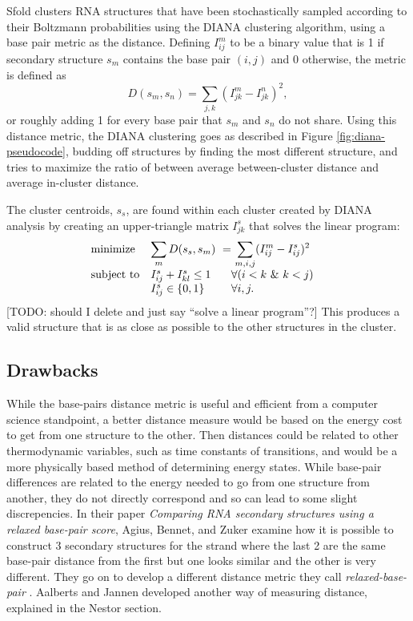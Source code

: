 Sfold clusters RNA structures that have been stochastically sampled
according to their Boltzmann probabilities using the DIANA clustering
algorithm, using a base pair metric as the distance. Defining
$I_{ij}^m$ to be a binary value that is 1 if secondary structure $s_m$
contains the base pair $(i,j)$ and 0 otherwise, the metric is defined
as
\begin{equation}
D(s_m, s_n) = \sum_{j,k} (I^m_{jk} - I^n_{jk})^2,
\end{equation}
or roughly adding 1 for every base pair that $s_m$ and $s_n$ do not
share. Using this distance metric, the DIANA clustering goes as
described in Figure \ref{fig:diana-pseudocode}, budding off structures
by finding the most different structure, and tries to maximize the
ratio of between average between-cluster distance and average
in-cluster distance.

The cluster centroids, $s_s$, are found within each cluster created by
DIANA analysis by creating an upper-triangle matrix $I^s_{jk}$ that
solves the linear program:
\begin{equation}
\begin{array}{ll@{}ll}
\text{minimize}  &\displaystyle\sum_{m} D(s_s, s_m)\  =&\ \displaystyle\sum_{m,i,j}( I^m_{ij} - I^s_{ij})^2 \\
\text{subject to}& I^s_{ij} + I^s_{kl} \leq 1    & \forall (i < k\ \&\ k < j) \\
                                                              & I^s_{ij} \in \{0, 1\} & \forall i,j. &
\end{array}
\end{equation}
[TODO: should I delete and just say ``solve a linear program''?]
This produces a valid structure that is as close as possible to the
other structures in the cluster. 

\subsection{Drawbacks}

While the base-pairs distance metric is useful and efficient from a
computer science standpoint, a better distance measure would be based
on the energy cost to get from one structure to the other. Then
distances could be related to other thermodynamic variables, such as
time constants of transitions, and would be a more physically based
method of determining energy states. While base-pair differences are
related to the energy needed to go from one structure from another,
they do not directly correspond and so can lead to some slight
discrepencies. In their paper \emph{Comparing RNA secondary structures
  using a relaxed base-pair score}, Agius, Bennet, and Zuker examine
how it is possible to construct 3 secondary structures for the strand
where the last 2 are the same base-pair distance from the first but
one looks similar and the other is very different. They go on to
develop a different distance metric they call \emph{relaxed-base-pair}
\cite{agius2010comparing}. Aalberts and Jannen developed another way
of measuring distance, explained in the Nestor section. 

